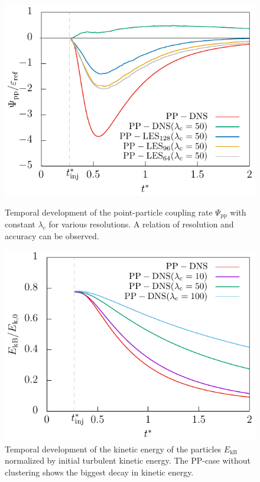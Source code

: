 \documentclass[11pt,a4paper,openany,oneside,parskip=half*]{article}
\begin{document}
\begin{figure}[]
    \centering
     \begin{minipage}[t]{0.5\textwidth}
        \centering
        \includegraphics[width=\linewidth]{./Abbildungen/vergleich_coupling_time50.pdf}
        \caption{Temporal development of the point-particle coupling rate $\Psi_\mathrm{pp}$ with constant $\lambda_\mathrm{c}$ for various resolutions. A relation of resolution and accuracy can be observed.}
        \label{vergleich_coupling_time_256}
        \end{minipage}%
    \begin{minipage}[t]{.5\textwidth}
         \centering
        \includegraphics[width=\linewidth]{./Abbildungen/256/particlekineticenergy_time.pdf}
        \caption{Temporal development of the kinetic energy of the particles $E_\mathrm{kB}$ normalized by initial turbulent kinetic energy. The PP-case without clustering shows the biggest decay in kinetic energy. }
        \label{particlekineticenergy_time_256}
    \end{minipage}
\end{figure}%
\end{document}
